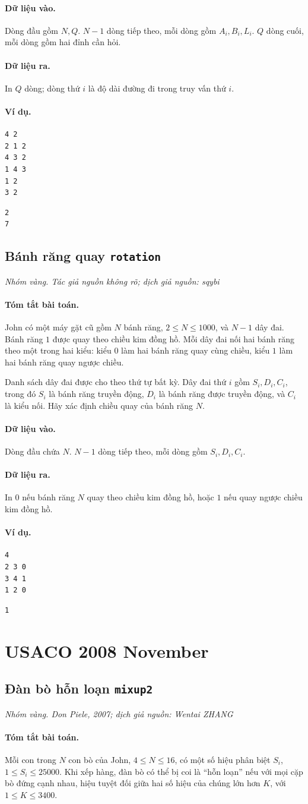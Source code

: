 \documentclass[11pt]{article}
\newcommand{\problem}[4]{%
  \subsection[#1 (#2)]{#1 \hfill {\normalsize\texttt{#2}}}%
  \noindent\textit{#3. #4}\par\smallskip
}
\newcommand{\iosec}[1]{\paragraph{#1}}
\begin{document}
\iosec{Dữ liệu vào.}
Dòng đầu gồm \(N,Q\). \(N-1\) dòng tiếp theo, mỗi dòng gồm \(A_i,B_i,L_i\).
\(Q\) dòng cuối, mỗi dòng gồm hai đỉnh cần hỏi.

\iosec{Dữ liệu ra.}
In \(Q\) dòng; dòng thứ \(i\) là độ dài đường đi trong truy vấn thứ \(i\).

\iosec{Ví dụ.}
\begin{verbatim}
4 2
2 1 2
4 3 2
1 4 3
1 2
3 2
\end{verbatim}

\begin{verbatim}
2
7
\end{verbatim}

\problem{Bánh răng quay}{rotation}{Nhóm vàng}{Tác giả nguồn không rõ; dịch giả nguồn: sqybi}

\iosec{Tóm tắt bài toán.}
John có một máy gặt cũ gồm \(N\) bánh răng, \(2\le N\le 1000\), và \(N-1\)
dây đai. Bánh răng \(1\) được quay theo chiều kim đồng hồ. Mỗi dây đai nối
hai bánh răng theo một trong hai kiểu: kiểu \(0\) làm hai bánh răng quay cùng
chiều, kiểu \(1\) làm hai bánh răng quay ngược chiều.

Danh sách dây đai được cho theo thứ tự bất kỳ. Dây đai thứ \(i\) gồm
\(S_i,D_i,C_i\), trong đó \(S_i\) là bánh răng truyền động, \(D_i\) là bánh
răng được truyền động, và \(C_i\) là kiểu nối. Hãy xác định chiều quay của
bánh răng \(N\).

\iosec{Dữ liệu vào.}
Dòng đầu chứa \(N\). \(N-1\) dòng tiếp theo, mỗi dòng gồm \(S_i,D_i,C_i\).

\iosec{Dữ liệu ra.}
In \(0\) nếu bánh răng \(N\) quay theo chiều kim đồng hồ, hoặc \(1\) nếu quay
ngược chiều kim đồng hồ.

\iosec{Ví dụ.}
\begin{verbatim}
4
2 3 0
3 4 1
1 2 0
\end{verbatim}

\begin{verbatim}
1
\end{verbatim}

\section{USACO 2008 November}

\problem{Đàn bò hỗn loạn}{mixup2}{Nhóm vàng}{Don Piele, 2007; dịch giả nguồn: Wentai ZHANG}

\iosec{Tóm tắt bài toán.}
Mỗi con trong \(N\) con bò của John, \(4\le N\le 16\), có một số hiệu phân
biệt \(S_i\), \(1\le S_i\le 25000\). Khi xếp hàng, đàn bò có thể bị coi là
``hỗn loạn'' nếu với mọi cặp bò đứng cạnh nhau, hiệu tuyệt đối giữa hai số
hiệu của chúng lớn hơn \(K\), với \(1\le K\le 3400\).
\end{document}
